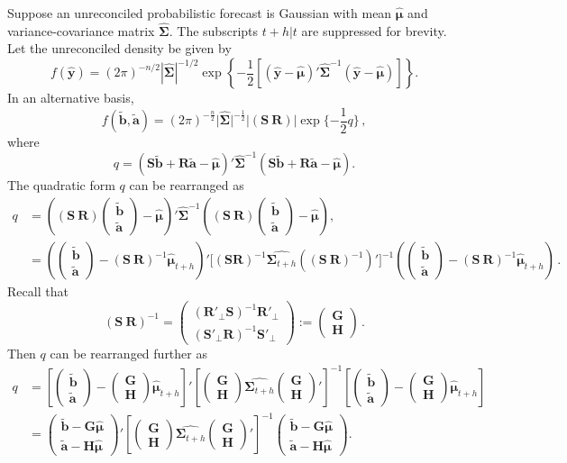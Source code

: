 \documentclass[12pt]{article}
\def\PQ{\begin{pmatrix}\bm{G}\\[-0.2cm]\bm{H}\end{pmatrix}}
\def\bt{\begin{pmatrix}\tilde{\bm{b}}\\[-0.2cm]\tilde{\bm{a}}\end{pmatrix}}
\theoremstyle{definition}
\begin{document}
Suppose an unreconciled probabilistic forecast is Gaussian with mean $\hat{\bm{\mu}}$ and variance-covariance matrix $\hat{\bm{\Sigma}}$. The subscripts $t+h|t$ are suppressed for brevity. Let the unreconciled density be given by
\begin{equation}
  f(\hat{\bm{y}})=(2\pi)^{-n/2}|\hat{\bm{\Sigma}}|^{-1/2}\exp\left\{-\frac{1}{2}\left[(\hat{\bm{y}}-\hat{\bm{\mu}})'\hat{\bm{\Sigma}}^{-1}(\hat{\bm{y}}-\hat{\bm{\mu}})\right]\right\}.
\end{equation}
In an alternative basis,
\begin{equation}
f(\tilde{\bm{b}},\tilde{\bm{a}})=(2\pi)^{-\frac{n}{2}}\Big|\hat{\bm{\Sigma}}\Big|^{-\frac{1}{2}}\Big|(\bm{S} ~  \bm{R})\Big|\exp\{-\frac{1}{2}q\}\,,
\end{equation}
where
\begin{equation}
q=(\bm{S}\tilde{\bm{b}}+\bm{R}\tilde{\bm{a}}-\hat{\bm{\mu}})' \hat{\bm{\Sigma}}^{-1}(\bm{S}\tilde{\bm{b}}+\bm{R}\tilde{\bm{a}}-\hat{\bm{\mu}}).
\end{equation}
The quadratic form $q$ can be rearranged as
\begin{align*}
q& =
\left((\bm{S} ~  \bm{R})\bt-\hat{\bm{\mu}}\right)' \hat{\bm{\Sigma}}^{-1}\left((\bm{S} ~ \bm{R})\bt-\hat{\bm{\mu}}\right),\\
& =
\left(\bt-(\bm{S} ~ \bm{R})^{-1}\hat{\bm{\mu}}_{t+h}\right)' \Big[(\bm{S}  \bm{R})^{-1}\hat{\bm{\Sigma}_{t+h}}\left((\bm{S} ~ \bm{R})^{-1}\right)'\Big]^{-1}
\left(\bt-(\bm{S} ~ \bm{R})^{-1}\hat{\bm{\mu}}_{t+h}\right)\,.
\end{align*}
Recall that
\[
  (\bm{S} ~ \bm{R})^{-1} =
  \begin{pmatrix}(\bm{R}'_\bot \bm{S})^{-1}\bm{R}'_\bot  \\ (\bm{S}'_\bot \bm{R})^{-1}\bm{S}'_\bot \end{pmatrix} :=
  \begin{pmatrix}
  \bm{G} \\\bm{H}
  \end{pmatrix}\,.
\]
Then $q$ can be rearranged further as
\begin{align*}
q& =%
\left[\bt-\PQ\hat{\bm{\mu}}_{t+h}\right]'%
\left[\PQ\hat{\bm{\Sigma}_{t+h}}\PQ'\right]^{-1}\left[\bt-\PQ\hat{\bm{\mu}}_{t+h}\right] %
\\[0.5cm]
 & =%
\begin{pmatrix}\tilde{\bm{b}} - \bm{G}\hat{\bm{\mu}}\\ \tilde{\bm{a}}- \bm{H}\hat{\bm{\mu}}\end{pmatrix}' %
 \left[\PQ\hat{\bm{\Sigma}_{t+h}}\PQ'\right]^{-1}\begin{pmatrix}\tilde{\bm{b}} - \bm{G}\hat{\bm{\mu}}\\ \tilde{\bm{a}}- \bm{H}\hat{\bm{\mu}}\end{pmatrix}. %
\end{align*}
\end{document}
